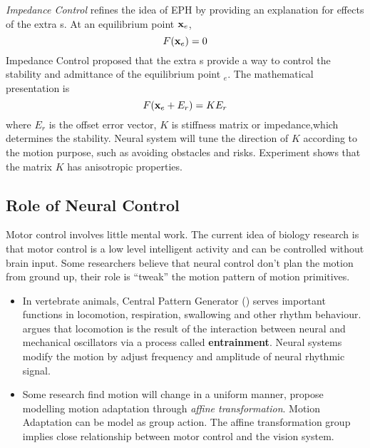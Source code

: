 \emph{Impedance Control} \citep{hogan1985ica} refines the idea of EPH by providing an explanation for effects of the extra \dof s. 
At an equilibrium point $\mathbf{x}_{e}$,
\[
F(\mathbf{x}_{e})=0 
\]
Impedance Control proposed that the extra \dof s provide a way to control the stability and admittance of the equilibrium point $_{e}$. 
The mathematical presentation is
\begin{equation}
F(\mathbf{x}_{e}+E_r)=KE_r
\end{equation}
where $E_r$ is the offset error vector, $K$ is stiffness matrix or impedance,which determines the stability.
Neural system will tune the direction of $K$ according to the motion purpose, such as avoiding obstacles and risks. 
Experiment \citep{Franklin2007} shows that the matrix $K$ has anisotropic properties.







\subsection{Role of Neural Control}
Motor control involves little mental work.
The current idea of biology research is that motor control is a low level intelligent activity and can be controlled  without brain input. 
Some researchers believe that neural control don't plan the motion from ground up, their role is ``tweak'' the motion pattern of motion primitives.
\begin{itemize}
\item
In vertebrate animals,  Central Pattern Generator (\cpg) serves important functions in locomotion, respiration, swallowing and other rhythm behaviour.
\citet{Cohen1988a} argues that locomotion is the result of the interaction between neural and mechanical oscillators via a process called \textbf{entrainment}.
Neural systems modify the motion by adjust frequency and amplitude of neural rhythmic signal.



\item
Some research find motion will change in a uniform manner\citep{Viviani1992},\citep{flash2007affine} propose modelling motion adaptation through \emph{affine transformation}.
Motion Adaptation can be model as group action.
The affine transformation group implies close relationship between motor control and the vision system.
\end{itemize}









